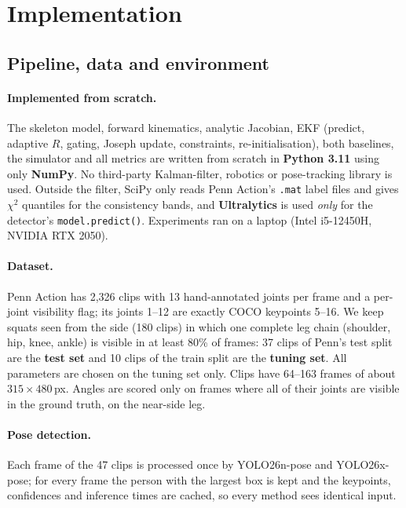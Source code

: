 \documentclass[12pt,a4paper]{article}
\begin{document}
\section{Implementation}

\subsection{Pipeline, data and environment}

\paragraph{Implemented from scratch.} The skeleton model, forward kinematics, analytic Jacobian, EKF
(predict, adaptive $R$, gating, Joseph update, constraints, re-initialisation), both baselines, the
simulator and all metrics are written from scratch in \textbf{Python 3.11} using only \textbf{NumPy}.
No third-party Kalman-filter, robotics or pose-tracking library is used. Outside the filter, SciPy only
reads Penn Action's \texttt{.mat} label files and gives $\chi^2$ quantiles for the consistency bands, and
\textbf{Ultralytics} \cite{ultralytics} is used \emph{only} for the detector's \texttt{model.predict()}.
Experiments ran on a laptop (Intel i5-12450H, NVIDIA RTX 2050).

\paragraph{Dataset.} Penn Action \cite{penn} has 2{,}326 clips with 13 hand-annotated joints per frame and a
per-joint visibility flag; its joints 1--12 are exactly COCO keypoints 5--16. We keep squats seen from the
side (180 clips) in which one complete leg chain (shoulder, hip, knee, ankle) is visible in at least 80\% of
frames: 37 clips of Penn's test split are the \textbf{test set} and 10 clips of the train split are the
\textbf{tuning set}. All parameters are chosen on the tuning set only. Clips have 64--163 frames of
about $315\times480$\,px. Angles are scored only on frames where all of their joints are visible in the
ground truth, on the near-side leg.

\paragraph{Pose detection.} Each frame of the 47 clips is processed once by YOLO26n-pose and
YOLO26x-pose; for every frame the person with the largest box is kept and the keypoints, confidences and
inference times are cached, so every method sees identical input.
\end{document}
